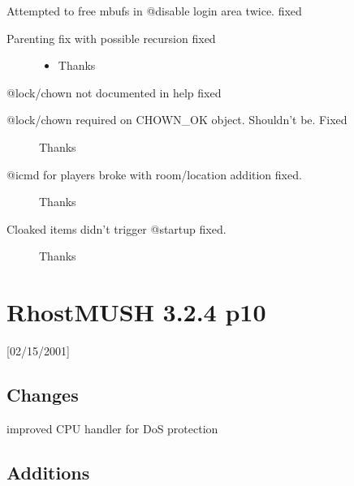 \documentclass[letterpaper,10pt,english]{sphinxmanual}
\begin{document}
\sphinxAtStartPar
Attempted to free mbufs in @disable login area twice.  \sphinxhyphen{} fixed
\begin{description}
\item[{Parenting fix with possible recursion \sphinxhyphen{} fixed}] \leavevmode\begin{itemize}
\item {} 
\sphinxAtStartPar
Thanks 

\end{itemize}

\end{description}

\sphinxAtStartPar
@lock/chown not documented in help \sphinxhyphen{} fixed
\begin{description}
\item[{@lock/chown required on CHOWN\_OK object.  Shouldn’t be.  \sphinxhyphen{} Fixed}] \leavevmode
\sphinxAtStartPar
\sphinxhyphen{}Thanks 

\item[{@icmd for players broke with room/location addition \sphinxhyphen{} fixed.}] \leavevmode
\sphinxAtStartPar
\sphinxhyphen{}Thanks 

\item[{Cloaked items didn’t trigger @startup \sphinxhyphen{} fixed.}] \leavevmode
\sphinxAtStartPar
\sphinxhyphen{}Thanks 

\end{description}


\section{RhostMUSH 3.2.4 p10}
\label{\detokenize{changelog:rhostmush-3-2-4-p10}}\label{\detokenize{changelog:changelog-3-2-4p10}}
\sphinxAtStartPar
{[}02/15/2001{]}


\subsection{Changes}
\label{\detokenize{changelog:id47}}
\sphinxAtStartPar
improved CPU handler for DoS protection


\subsection{Additions}
\label{\detokenize{changelog:id48}}
\end{document}
